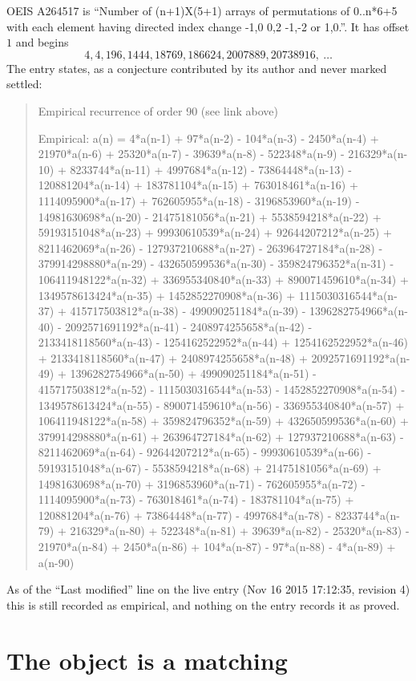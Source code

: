 \documentclass[11pt,a4paper]{article}
\theoremstyle{plain}
\theoremstyle{definition}
\begin{document}
OEIS A264517 is ``Number of (n+1)X(5+1) arrays of permutations of 0..n*6+5 with each element having directed index change -1,0 0,2 -1,-2 or 1,0.''. It has offset $1$ and begins
\[
4, 4, 196, 1444, 18769, 186624, 2007889, 20738916,\ \dots
\]
The entry states, as a conjecture contributed by its author and never marked settled:
\begin{quote}
Empirical recurrence of order 90 (see link above)

Empirical: a(n) = 4*a(n-1) + 97*a(n-2) - 104*a(n-3) - 2450*a(n-4) + 21970*a(n-6) + 25320*a(n-7) - 39639*a(n-8) - 522348*a(n-9) - 216329*a(n-10) + 8233744*a(n-11) + 4997684*a(n-12) - 73864448*a(n-13) - 120881204*a(n-14) + 183781104*a(n-15) + 763018461*a(n-16) + 1114095900*a(n-17) + 762605955*a(n-18) - 3196853960*a(n-19) - 14981630698*a(n-20) - 21475181056*a(n-21) + 5538594218*a(n-22) + 59193151048*a(n-23) + 99930610539*a(n-24) + 92644207212*a(n-25) + 8211462069*a(n-26) - 127937210688*a(n-27) - 263964727184*a(n-28) - 379914298880*a(n-29) - 432650599536*a(n-30) - 359824796352*a(n-31) - 106411948122*a(n-32) + 336955340840*a(n-33) + 890071459610*a(n-34) + 1349578613424*a(n-35) + 1452852270908*a(n-36) + 1115030316544*a(n-37) + 415717503812*a(n-38) - 499090251184*a(n-39) - 1396282754966*a(n-40) - 2092571691192*a(n-41) - 2408974255658*a(n-42) - 2133418118560*a(n-43) - 1254162522952*a(n-44) + 1254162522952*a(n-46) + 2133418118560*a(n-47) + 2408974255658*a(n-48) + 2092571691192*a(n-49) + 1396282754966*a(n-50) + 499090251184*a(n-51) - 415717503812*a(n-52) - 1115030316544*a(n-53) - 1452852270908*a(n-54) - 1349578613424*a(n-55) - 890071459610*a(n-56) - 336955340840*a(n-57) + 106411948122*a(n-58) + 359824796352*a(n-59) + 432650599536*a(n-60) + 379914298880*a(n-61) + 263964727184*a(n-62) + 127937210688*a(n-63) - 8211462069*a(n-64) - 92644207212*a(n-65) - 99930610539*a(n-66) - 59193151048*a(n-67) - 5538594218*a(n-68) + 21475181056*a(n-69) + 14981630698*a(n-70) + 3196853960*a(n-71) - 762605955*a(n-72) - 1114095900*a(n-73) - 763018461*a(n-74) - 183781104*a(n-75) + 120881204*a(n-76) + 73864448*a(n-77) - 4997684*a(n-78) - 8233744*a(n-79) + 216329*a(n-80) + 522348*a(n-81) + 39639*a(n-82) - 25320*a(n-83) - 21970*a(n-84) + 2450*a(n-86) + 104*a(n-87) - 97*a(n-88) - 4*a(n-89) + a(n-90)
\end{quote}
As of the ``Last modified'' line on the live entry (Nov 16 2015 17:12:35, revision 4) this is still
recorded as empirical, and nothing on the entry records it as proved.

\section{The object is a matching}
\end{document}
